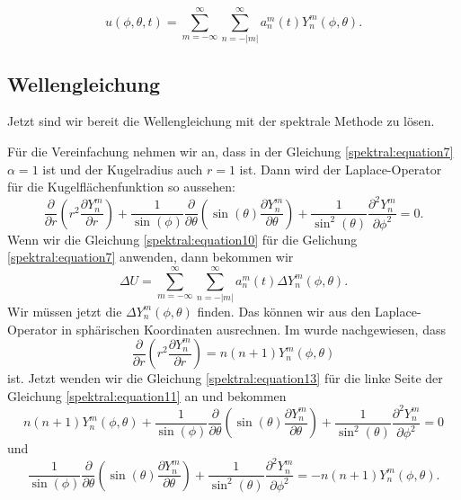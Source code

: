 \begin{equation}
u(\phi,\theta,t) = \sum_{m=-\infty}^{\infty}\sum_{n=-|m|}^{\infty}a_n^m(t)Y_n^m(\phi, \theta).
\label{spektral:equation10}
\end{equation}

\subsection{Wellengleichung
\label{spektral:subsection:wellengleichung}}
Jetzt sind wir bereit die Wellengleichung mit der spektrale Methode zu lösen.

Für die Vereinfachung nehmen wir an, dass in der Gleichung \eqref{spektral:equation7} $\alpha=1$ ist und der Kugelradius auch $r=1$ ist.
Dann wird der Laplace-Operator für die Kugelflächenfunktion so aussehen:
\begin{equation}
 \frac{\partial}{\partial{r}}\left(r^2\frac{\partial{Y_n^m}}{\partial{r}}\right) + \frac{1}{\sin(\phi)}\frac{\partial}{\partial{\theta}}\left(\sin(\theta)\frac{\partial{Y_n^m}}{\partial{\theta}}\right) + \frac{1}{\sin^2(\theta)}\frac{\partial^2{Y_n^m}}{\partial{\phi^2}} = 0.
\label{spektral:equation11}
\end{equation}
Wenn wir die Gleichung \eqref{spektral:equation10} für die Gelichung \eqref{spektral:equation7} anwenden, dann bekommen wir
\begin{equation}
\Delta{U} = \sum_{m=-\infty}^{\infty}\sum_{n=-|m|}^{\infty}a_n^m(t)\Delta{Y_n^m(\phi, \theta)}.
\label{spektral:equation12}
\end{equation}
Wir müssen jetzt die $\Delta{Y_n^m(\phi, \theta)}$ finden.
Das können wir aus den Laplace-Operator in sphärischen Koordinaten ausrechnen.
Im \cite[Seite 656]{spektral:DynamicOfTheAtmosphere} wurde nachgewiesen, dass 
\begin{equation}
\frac{\partial}{\partial{r}}\left(r^2\frac{\partial{Y_n^m}}{\partial{r}}\right) = n(n+1)Y_n^m(\phi, \theta)
\label{spektral:equation13}
\end{equation}
ist.
Jetzt wenden wir die Gleichung \eqref{spektral:equation13} für die linke Seite der Gleichung \eqref{spektral:equation11} an und bekommen
\begin{equation}
n(n+1)Y_n^m(\phi, \theta) + \frac{1}{\sin(\phi)}\frac{\partial}{\partial{\theta}}\left(\sin(\theta)\frac{\partial{Y_n^m}}{\partial{\theta}}\right) + \frac{1}{\sin^2(\theta)}\frac{\partial^2{Y_n^m}}{\partial{\phi^2}} = 0
\label{spektral:equation14}
\end{equation}
und
\begin{equation}
\frac{1}{\sin(\phi)}\frac{\partial}{\partial{\theta}}\left(\sin(\theta)\frac{\partial{Y_n^m}}{\partial{\theta}}\right) + \frac{1}{\sin^2(\theta)}\frac{\partial^2{Y_n^m}}{\partial{\phi^2}} = -n(n+1)Y_n^m(\phi, \theta).
\label{spektral:equation15}
\end{equation}
